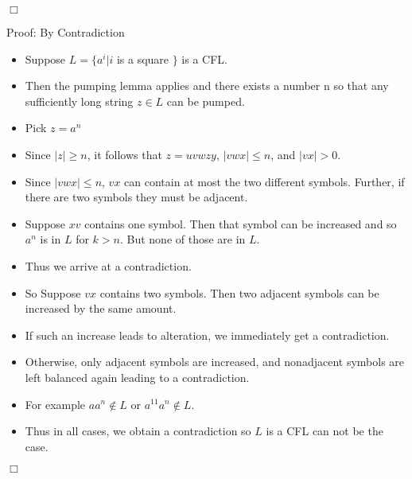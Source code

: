 \documentclass[11pt]{article}
\newcommand{\question}[2] {\vspace{.25in} \fbox{#1} #2 \vspace{.10in}}
\begin{document}
\indent $\Box$

\pagebreak

\question{2}{Proof: By Contradiction}

 \begin{center}
  \begin{itemize}

    \item Suppose $L = \{ a^{i} | i $ is a square $ \}$ is a CFL.

    \item Then the pumping lemma applies and there exists a number n so that any sufficiently long string $z \in L$ can be pumped.

    \item Pick $z = a^n$

    \item Since $|z| \geq n$, it follows that $z = uvwzy$, $|vwx| \leq n$, and $|vx| > 0 $.

    \item Since $|vwx| \leq n$, $vx$ can contain at most the two different symbols. Further, if there are two symbols they must be adjacent.

    \item Suppose $xv$ contains one symbol. Then that symbol can be increased and so $a^n$ is in $L$ for $k > n$. But none of those are in $L$.

    \item Thus we arrive at a contradiction.

    \item So Suppose $vx$ contains two symbols. Then two adjacent symbols can be increased by the same amount.
    
    \item If such an increase leads to alteration, we immediately get a contradiction.
    
    \item Otherwise, only adjacent symbols are increased, and nonadjacent symbols are left balanced again leading to a contradiction. 

    \item For example $a a^n \notin L$ or $ a^{11} a^n \notin L$.

    \item Thus in all cases, we obtain a contradiction so $L$ is a CFL can not be the case.

  \end{itemize}
\end{center}
\indent\indent $\Box$
\end{document}
